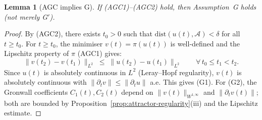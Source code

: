 \documentclass[12pt,a4paper]{article}
\theoremstyle{definition}
\theoremstyle{plain}
\newtheorem{lemma}[definition]{Lemma}
\theoremstyle{remark}
\begin{document}
\begin{lemma}[AGC implies G]\label{lem:AGC-implies-G}
If \textup{(AGC1)--(AGC2)} hold, then Assumption~G holds
\textup{(}not merely G$'$\textup{)}.
\end{lemma}

\begin{proof}
By (AGC2), there exists $t_0 > 0$ such that
$\mathrm{dist}(u(t), \mathcal{A}) < \delta$ for all $t \ge t_0$.
For $t \ge t_0$, the minimiser $v(t) = \pi(u(t))$ is well-defined and
the Lipschitz property of $\pi$ (AGC1) gives:
\[
  \|v(t_2) - v(t_1)\|_{L^2}
  \;\le\;
  \|u(t_2) - u(t_1)\|_{L^2}
  \qquad \forall\, t_0 \le t_1 < t_2.
\]
Since $u(t)$ is absolutely continuous in $L^2$ (Leray--Hopf regularity),
$v(t)$ is absolutely continuous with $\|\partial_t v\| \le \|\partial_t u\|$
a.e. This gives (G1). For (G2), the Gronwall coefficients $C_1(t),
C_2(t)$ depend on $\|v(t)\|_{W^{1,\infty}}$ and $\|\partial_t v(t)\|$;
both are bounded by
Proposition~\ref{prop:attractor-regularity}(iii) and the Lipschitz
estimate.
\end{proof}
\end{document}

